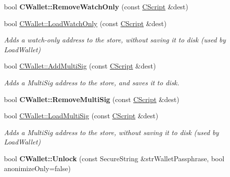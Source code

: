 \begin{DoxyCompactItemize}
bool {\bfseries C\+Wallet\+::\+Remove\+Watch\+Only} (const \mbox{\hyperlink{class_c_script}{C\+Script}} \&dest)
\item 
\mbox{\label{group__map_wallet_gad6580f1844fc639389e1c6a1e2787ee6}} 
bool \mbox{\hyperlink{group__map_wallet_gad6580f1844fc639389e1c6a1e2787ee6}{C\+Wallet\+::\+Load\+Watch\+Only}} (const \mbox{\hyperlink{class_c_script}{C\+Script}} \&dest)
\begin{DoxyCompactList}\small\item\em Adds a watch-\/only address to the store, without saving it to disk (used by Load\+Wallet) \end{DoxyCompactList}\item 
\mbox{\label{group__map_wallet_gab19582b017922e4c502491cc55a67621}} 
bool \mbox{\hyperlink{group__map_wallet_gab19582b017922e4c502491cc55a67621}{C\+Wallet\+::\+Add\+Multi\+Sig}} (const \mbox{\hyperlink{class_c_script}{C\+Script}} \&dest)
\begin{DoxyCompactList}\small\item\em Adds a Multi\+Sig address to the store, and saves it to disk. \end{DoxyCompactList}\item 
\mbox{\label{group__map_wallet_ga55e45c945a8c80d52742bd536afc8e78}} 
bool {\bfseries C\+Wallet\+::\+Remove\+Multi\+Sig} (const \mbox{\hyperlink{class_c_script}{C\+Script}} \&dest)
\item 
\mbox{\label{group__map_wallet_gab07b5d46c02a9997a653a9063af9d4ca}} 
bool \mbox{\hyperlink{group__map_wallet_gab07b5d46c02a9997a653a9063af9d4ca}{C\+Wallet\+::\+Load\+Multi\+Sig}} (const \mbox{\hyperlink{class_c_script}{C\+Script}} \&dest)
\begin{DoxyCompactList}\small\item\em Adds a Multi\+Sig address to the store, without saving it to disk (used by Load\+Wallet) \end{DoxyCompactList}\item 
\mbox{\label{group__map_wallet_ga654ae5a3a7c4c7c7bfd271f108781b40}} 
bool {\bfseries C\+Wallet\+::\+Unlock} (const Secure\+String \&str\+Wallet\+Passphrase, bool anonimize\+Only=false)
\item 
\mbox{\label{group__map_wallet_ga4abcec3066e7c462f4564c159fc15031}} 

\end{DoxyCompactItemize}
